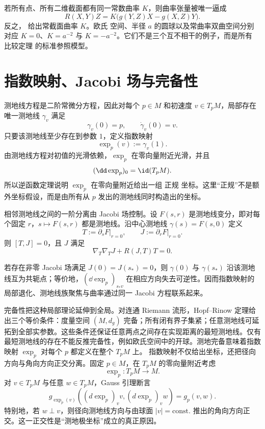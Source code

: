 若所有点、所有二维截面都有同一常数曲率 $K$，则曲率张量被唯一逼成
\begin{equation}\label{eq:math-dg-space-form-curvature}
R(X,Y)Z
=K\bigl(g(Y,Z)X-g(X,Z)Y\bigr).
\end{equation}
反之， 给出常截面曲率 $K$。欧氏 空间、半径 $a$ 的圆球以及常曲率双曲空间分别对应 $K=0$、$K=a^{-2}$ 与 $K=-a^{-2}$。它们不是三个互不相干的例子，而是所有 比较定理 的标准参照模型。

\section{指数映射、Jacobi 场与完备性}

测地线方程是二阶常微分方程，因此对每个 $p\in M$ 和初速度 $v\in T_pM$，局部存在唯一测地线 $\gamma_v$ 满足
\[
\gamma_v(0)=p,
\qquad
\dot\gamma_v(0)=v.
\]
只要该测地线至少存在到参数 $1$，定义指数映射
\begin{equation*}\exp_p(v):=\gamma_v(1).
\end{equation*}
由测地线方程对初值的光滑依赖，$\exp_p$ 在零向量附近光滑，并且
\[
(\dd\exp_p)_0=\id(T_pM).
\]
所以逆函数定理说明 $\exp_p$ 在零向量附近给出一组 正规 坐标。这里“正规”不是额外坐标假设，而是由所有从 $p$ 发出的测地线同时构造出的坐标。

相邻测地线之间的一阶分离由 Jacobi 场控制。设 $F(s,r)$ 是测地线变分，即对每个固定 $r$，$s\mapsto F(s,r)$ 都是测地线。沿中心测地线 $\gamma(s)=F(s,0)$ 定义
\[
T:=\partial_sF\big|_{r=0},
\qquad
J:=\partial_rF\big|_{r=0}.
\]
则 $[T,J]=0$，且 $J$ 满足
\begin{equation}\label{eq:math-dg-jacobi-equation}
{\nabla_T\nabla_TJ+R(J,T)T=0.}
\end{equation}

若存在非零 Jacobi 场满足 $J(0)=J(s_*)=0$，则 $\gamma(0)$ 与 $\gamma(s_*)$ 沿该测地线互为共轭点；等价地，$(\dd\exp_p)_{s_*v}$ 在相应方向失去可逆性。因而指数映射的局部退化、测地线族聚焦与曲率通过同一 Jacobi 方程联系起来。

完备性把这种局部理论延伸到全局。对连通 Riemann 流形，Hopf--Rinow 定理给出三个等价条件：度量空间 $(M,d_g)$ 完备；所有闭有界子集紧；任意测地线可延拓到全部实参数。这些条件还保证任意两点之间存在实现距离的最短测地线。仅有最短测地线的存在不能反推完备性，例如欧氏空间中的开球。测地完备意味着指数映射 $\exp_p$ 对每个 $p$ 都定义在整个 $T_pM$ 上。
指数映射不仅给出坐标，还把径向方向与角向方向正交分离。固定 $p\in M$，在 $T_pM$ 的零向量附近考虑
\[
\exp_p:T_pM\to M.
\]
对 $v\in T_pM$ 与任意 $w\in T_pM$，Gauss 引理断言
\begin{equation}\label{eq:math-dg-gauss-lemma}
 g_{\exp_p(v)}\!\left(
 (d\exp_p)_v v,
 (d\exp_p)_v w
 \right)
 =g_p(v,w).
\end{equation}
特别地，若 $w\perp v$，则径向测地线方向与由球面 $|v|=\mathrm{const.}$ 推出的角向方向正交。这一正交性是“测地极坐标”成立的真正原因。

